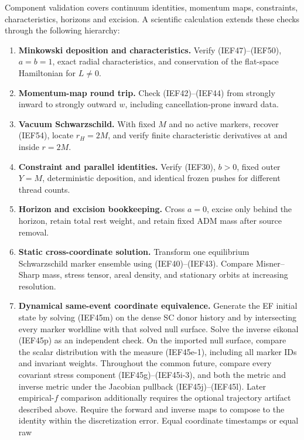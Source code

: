 Component validation covers continuum identities, momentum maps,
constraints, characteristics, horizons and excision. A scientific calculation
extends these checks through the following hierarchy:
\begin{enumerate}
\item \textbf{Minkowski deposition and characteristics.}
      Verify (IEF47)--(IEF50), \(a=b=1\), exact radial characteristics, and
      conservation of the flat-space Hamiltonian for \(L\ne0\).
\item \textbf{Momentum-map round trip.}
      Check (IEF42)--(IEF44) from strongly inward to strongly outward \(w\),
      including cancellation-prone inward data.
\item \textbf{Vacuum Schwarzschild.}
      With fixed \(M\) and no active markers, recover (IEF54), locate
      \(r_H=2M\), and verify finite characteristic derivatives at and inside
      \(r=2M\).
\item \textbf{Constraint and parallel identities.}
      Verify (IEF30), \(b>0\), fixed outer \(Y=M\), deterministic deposition,
      and identical frozen pushes for different thread counts.
\item \textbf{Horizon and excision bookkeeping.}
      Cross \(a=0\), excise only behind the horizon, retain total rest weight,
      and retain fixed ADM mass after source removal.
\item \textbf{Static cross-coordinate solution.}
      Transform one equilibrium Schwarzschild marker ensemble
      using (IEF40)--(IEF43).  Compare Misner--Sharp mass, stress tensor,
      areal density, and stationary orbits at increasing resolution.
\item \textbf{Dynamical same-event coordinate equivalence.}
      Generate the EF initial state by solving (IEF45m) on the dense SC donor
      history and by intersecting every marker worldline with that solved null
      surface.  Solve the inverse eikonal (IEF45p) as an independent check.
      On the imported null surface, compare the scalar distribution with the
      measure (IEF45e-1), including all marker IDs and invariant weights.
      Throughout the common future, compare every covariant stress component
      (IEF45g)--(IEF45i-3), and both the metric and inverse metric under the
      Jacobian pullback (IEF45j)--(IEF45l).  Later empirical-\(f\) comparison
      additionally requires the optional trajectory artifact described above.
      Require the forward and inverse maps to compose to the identity within
      the discretization error.  Equal coordinate timestamps or equal raw

\end{enumerate}
